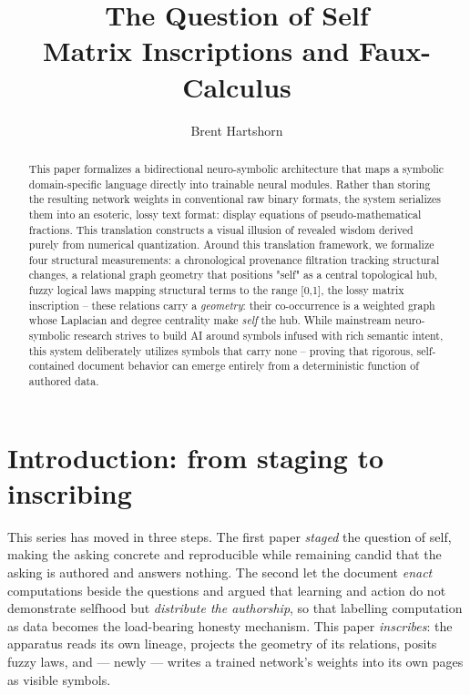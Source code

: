 \documentclass[11pt]{article}
\title{\textbf{The Question of Self}\\[2pt] \large Matrix Inscriptions and Faux-Calculus}
\author{Brent Hartshorn}
\begin{document}
\maketitle

\begin{abstract}
This paper formalizes a bidirectional neuro-symbolic architecture that maps a symbolic domain-specific language
directly into trainable neural modules. Rather than storing the resulting network weights in conventional raw 
binary formats, the system serializes them into an esoteric, lossy text format: display equations of 
pseudo-mathematical fractions. This translation constructs a visual illusion of revealed wisdom derived purely from numerical quantization. Around this translation framework, we formalize four structural measurements: a chronological provenance filtration tracking structural changes, a relational graph geometry that positions "self" as a central topological hub, fuzzy logical laws mapping structural terms to the range [0,1], the lossy matrix inscription --
these relations carry a \emph{geometry}: their co-occurrence is a weighted graph whose Laplacian
and degree centrality make \emph{self} the hub. While mainstream neuro-symbolic research strives to build AI around symbols infused with rich semantic intent, this system deliberately utilizes symbols that carry none -- proving that rigorous, self-contained document behavior can emerge entirely from a deterministic function of authored data.

\end{abstract}

\section{Introduction: from staging to inscribing}
This series has moved in three steps. The first paper \cite{paper1} \emph{staged}
the question of self, making the asking concrete and reproducible while remaining
candid that the asking is authored and answers nothing. The second \cite{paper2}
let the document \emph{enact} computations beside the questions and argued that
learning and action do not demonstrate selfhood but \emph{distribute the
authorship}, so that labelling computation as data becomes the load-bearing
honesty mechanism. This paper \emph{inscribes}: the apparatus reads its own
lineage, projects the geometry of its relations, posits fuzzy laws, and --- newly
--- writes a trained network's weights into its own pages as visible symbols.
\end{document}
